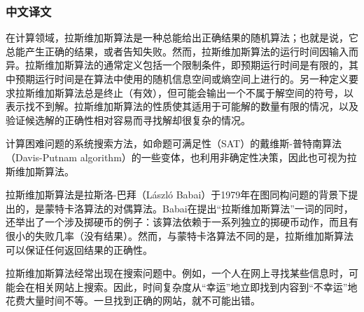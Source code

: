 \subsubsection*{中文译文}
在计算领域，拉斯维加斯算法是一种总能给出正确结果的随机算法；也就是说，它总能产生正确的结果，或者告知失败。然而，拉斯维加斯算法的运行时间因输入而异。拉斯维加斯算法的通常定义包括一个限制条件，即预期运行时间是有限的，其中预期运行时间是在算法中使用的随机信息空间或熵空间上进行的。另一种定义要求拉斯维加斯算法总是终止（有效），但可能会输出一个不属于解空间的符号，以表示找不到解。拉斯维加斯算法的性质使其适用于可能解的数量有限的情况，以及验证候选解的正确性相对容易而寻找解却很复杂的情况。\par
计算困难问题的系统搜索方法，如命题可满足性（SAT）的戴维斯-普特南算法（Davis-Putnam algorithm）的一些变体，也利用非确定性决策，因此也可视为拉斯维加斯算法。\par
拉斯维加斯算法是拉斯洛-巴拜（László Babai）于1979年在图同构问题的背景下提出的，是蒙特卡洛算法的对偶算法。Babai在提出“拉斯维加斯算法”一词的同时，还举出了一个涉及掷硬币的例子：该算法依赖于一系列独立的掷硬币动作，而且有很小的失败几率（没有结果）。然而，与蒙特卡洛算法不同的是，拉斯维加斯算法可以保证任何返回结果的正确性。\par
拉斯维加斯算法经常出现在搜索问题中。例如，一个人在网上寻找某些信息时，可能会在相关网站上搜索。因此，时间复杂度从“幸运”地立即找到内容到“不幸运”地花费大量时间不等。一旦找到正确的网站，就不可能出错。\par

\clearpage

